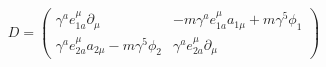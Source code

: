 \begin{equation}
\label{DIRA-MATR}
D = \left(
\begin{array}{cc}
\gamma^a e^\mu_{1a} \partial_\mu  &  -m \gamma^a e^\mu_{1a} a_{1\mu} + m \gamma^5 \phi_1 \\
\gamma^a e^\mu_{2a} a_{2\mu} -m \gamma^5 \phi_2 & \gamma^a
e^\mu_{2a}\partial_\mu
\end{array}\right)
\end{equation}

